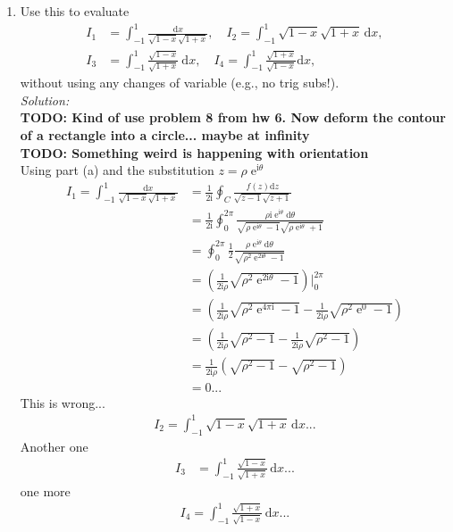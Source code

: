 \documentclass[10pt]{amsart}
\newcommand{\D}{\mathrm{d}}
\newcommand{\I}{\mathrm{i}}
\DeclareMathOperator{\E}{e}
\theoremstyle{nonumberplain}
\begin{document}
\begin{enumerate}[label={\bf {\arabic*}:}]
\begin{enumerate}
\item Use this to evaluate
\begin{align*}
	I_1 &= \int_{-1}^1 \frac{\D x}{\sqrt{1 -x} \sqrt{1+x}}, \quad
	I_2 = \int_{-1}^1 \sqrt{1 -x} \sqrt{1 + x}\, \D x, \\
	I_3 &= \int_{-1}^1 \frac{\sqrt{1 -x}}{ \sqrt{1 + x}}\ \D x,
	\quad   I_4 = \int_{-1}^1 \frac{\sqrt{1  +x}}{ \sqrt{1 - x}} \D x,
\end{align*}
without using any changes of variable (e.g., no trig subs!).\\

\noindent
\textit{Solution:} \\
\textbf{TODO: Kind of use problem 8 from hw 6. Now deform the contour of a rectangle into a circle... maybe at infinity} \\
\textbf{TODO: Something weird is happening with orientation} \\
Using part (a) and the substitution $z = \rho \E^{\I \theta}$
\begin{align*}
I_1 = \int_{-1}^1 \frac{\D x}{\sqrt{1 -x} \sqrt{1+x}}
	&= \frac{1}{2\I} \oint_C \frac{f(z)\D z}{\sqrt{z -1} \sqrt{z + 1}} \\
	&= \frac{1}{2\I} \oint_0^{2\pi} \frac {\rho \I \E^{\I \theta} \D \theta}{\sqrt{\rho \E^{\I \theta} -1} \sqrt{\rho \E^{\I \theta} + 1}} \\
	&= \oint_0^{2\pi} \frac{1}{2} \frac {\rho \E^{\I \theta} \D \theta}{\sqrt{\rho^2 \E^{2 \I \theta} -1}} \\
	&= \left( \frac{1}{2 \I \rho} \sqrt{\rho^2 \E^{2 \I \theta} -1} \right) \bigg|_{0}^{2 \pi} \\
	&= \left( \frac{1}{2 \I \rho} \sqrt{\rho^2 \E^{4 \pi \I} -1} - \frac{1}{2 \I \rho} \sqrt{\rho^2 \E^{0} -1} \right) \\
	&= \left( \frac{1}{2 \I \rho} \sqrt{\rho^2 -1} - \frac{1}{2 \I \rho} \sqrt{\rho^2 -1} \right) \\
	&= \frac{1}{2 \I \rho} \left( \sqrt{\rho^2 -1} - \sqrt{\rho^2 -1} \right) \\
	&= 0...
\end{align*}
This is wrong...
\begin{align*}
I_2 = \int_{-1}^1 \sqrt{1 -x} \sqrt{1 + x}\, \D x...
\end{align*}
Another one
\begin{align*}
I_3 &= \int_{-1}^1 \frac{\sqrt{1 -x}}{ \sqrt{1 + x}}\, \D x...
\end{align*}
one more
\begin{align*}
I_4 = \int_{-1}^1 \frac{\sqrt{1  +x}}{ \sqrt{1 - x}}\, \D x...
\end{align*}
\end{enumerate}
\newpage


\end{enumerate}
\end{document}
